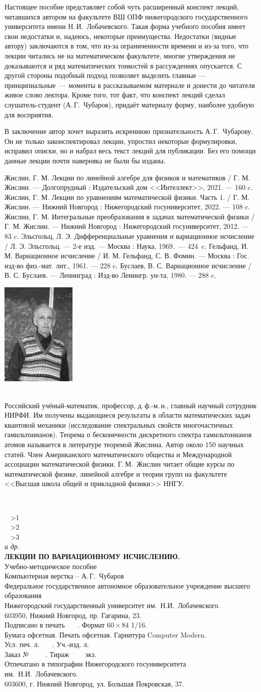 \documentclass[10pt,a5paper,openany]{book}
\theoremstyle{definition}
\newcommand{\aboutauthor}{\newpage
	\thispagestyle{empty}
	\noindent\parbox{0.29\textwidth}{\includegraphics[width=0.27\textwidth]{Zhislin.jpg}}\parbox{0.69\textwidth}{\MakeUppercase{\athFA~\athNA}\\ \footnotesize Российский учёный-математик, профессор, д.\,ф.-м.\,н., главный научный сотрудник НИРФИ. Им получены выдающиеся результаты в области математических задач квантовой механики (исследование спектральных свойств многочастичных гамильтонианов). Теорема о бесконечности дискретного спектра гамильтонианов атомов называется в литературе теоремой Жислина. Автор около 150 научных статей. Член Американского математического общества и Международной ассоциации математической физики. Г.\,М.~Жислин читает общие курсы по математической физике, линейной алгебре и теории групп на факультете <<Высшая школа общей и прикладной физики>> ННГУ.}}
\newcommand{\lastpage}{
	\clearpage
	\thispagestyle{empty}
	~
	\vfill
	\begin{center}
		\athNA~\textbf{\athFA}
		\ifnum\numAuths>1\\\athNB~\textbf{\athFB}\fi
		\ifnum\numAuths>2\\\athNC~\textbf{\athFC}\fi
		\ifnum\numAuths>3\\\textit{и др.}\fi
		\\[12pt]
		\textbf{\MakeUppercase{\setTitle.}}\\[12pt]
		\setKind \\[24pt]
		Компьютерная верстка -- А.\,Г.~Чубаров\\[12pt]
		Федеральное государственное автономное образовательное учреждение высшего образования\\
		Нижегородский государственный университет им.~Н.И.~Лобачевского.\\
		603950, Нижний Новгород, пр. Гагарина, 23.\\[12pt]		
		Подписано в печать \ \ \ . Формат $60\times84$ 1/16.\\
		Бумага офсетная. Печать офсетная. Гарнитура Computer Modern.\\
		Усл. печ. л. \ \ \ . Уч.-изд. л.\\
		Заказ № \ \ \ \ . Тираж \ \ \ \ экз.\\[12pt]
		Отпечатано в типографии Нижегородского госуниверситета
		им.~Н.И.~Лобачевского.\\
		603600, г. Нижний Новгород, ул. Большая Покровская, 37.
	\end{center}
}
\newcommand{\setTitle}{Лекции по вариационному исчислению}
\newcommand{\numAuths}{1}
\newcommand{\setKind}{Учебно-методическое пособие}
\begin{document}
	Настоящее пособие представляет собой чуть расширенный конспект лекций, читавшихся автором на факультете ВШ ОПФ нижегородского государственного университета имени Н.\,И.~Лобачевского. Такая форма учебного пособия имеет свои недостатки и, надеюсь, некоторые преимущества. Недостатки (видные автору) заключаются в том, что из-за ограниченности времени и из-за того, что лекции читались не на математическом факультете, многие утверждения не доказываются и ряд математических тонкостей в рассуждениях опускается. С другой стороны подобный подход позволяет выделить главные --- принципиальные~--- моменты в рассказываемом материале и донести до читателя живое слово лектора. Кроме того, тот факт, что конспект лекций сделал слушатель-студент (А.\,Г.~Чубаров), придаёт материалу форму, наиболее удобную для восприятия.
	
	В заключение автор хочет выразить искреннюю признательность А.\,Г.~Чубарову. Он не только законспектировал лекции, упростил некоторые формулировки, исправил описки, но и набрал весь текст лекций для публикации. Без его помощи данные лекции почти наверняка не были бы изданы.

	
	
	
	
	
	
	
	
	
	

\begin{thebibliography}{99}
	\label{bibliography}
	 Жислин, Г. М. Лекции по линейной алгебре для физиков и математиков / Г. М. Жислин. --- Долгопрудный : Издательский дом <<Интеллект>>, 2021. --- 160 c.
	 Жислин, Г. М. Лекции по уравнениям математической физики. Часть 1.  / Г. М. Жислин. --- Нижний Новгород : Нижегородский госуниверситет, 2022. --- 108 c. 
	 Жислин, Г. М. Интегральные преобразования в задачах математической физики / Г. М. Жислин. --- Нижний Новгород : Нижегородский госуниверситет, 2012. --- 83 c.
	 Эльсгольц, Л. Э. Дифференциальные уравнения и вариационное исчисление / Л. Э. Эльсгольц. --- 2-е изд. --- Москва : Наука, 1969.~--- 424~c.
	 Гельфанд, И. М. Вариационное исчисление / И. М. Гельфанд, С. В. Фомин. --- Москва : Гос. изд-во физ.-мат. лит., 1961. --- 228 c.
	 Буслаев, В. С. Вариационное исчисление / В. С. Буслаев. --- Ленинград : Изд-во Ленингр. ун-та, 1980. --- 288 c.
\end{thebibliography}
\aboutauthor
\lastpage
\end{document}
